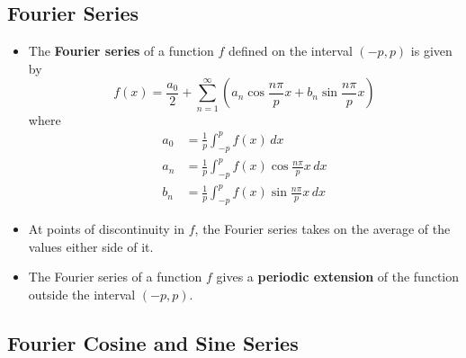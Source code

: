 \documentclass{article}
\begin{document}
\subsection{Fourier Series}

\begin{itemize}
  \item The \textbf{Fourier series} of a function $f$ defined on the interval $(-p, p)$ is given by \[f(x) = \frac{a_0}{2} + \sum_{n = 1}^\infty \left( a_n \cos \frac{n \pi}{p} x + b_n \sin \frac{n \pi}{p} x \right)\] where \begin{align*}
          a_0 & = \frac{1}{p} \int_{-p}^p f(x) \,d x                        \\
          a_n & = \frac{1}{p} \int_{-p}^p f(x) \cos \frac{n \pi}{p} x \,d x \\
          b_n & = \frac{1}{p} \int_{-p}^p f(x) \sin \frac{n \pi}{p} x \,d x
        \end{align*}

  \item At points of discontinuity in $f$, the Fourier series takes on the average of the values either side of it.

  \item The Fourier series of a function $f$ gives a \textbf{periodic extension} of the function outside the interval $(-p, p)$.
\end{itemize}

\subsection{Fourier Cosine and Sine Series}
\end{document}

